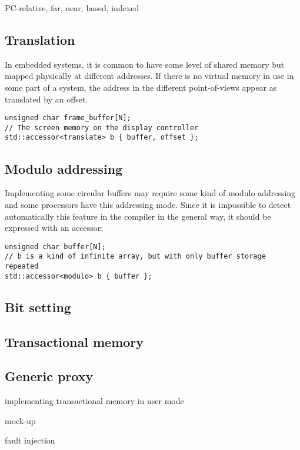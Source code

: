 \documentclass[a4paper]{article}
\begin{document}
PC-relative, far, near, based, indexed

\subsection{Translation}
\label{sec:translation}

In embedded systems, it is common to have some level of shared memory
but mapped physically at different addresses. If there is no virtual
memory in use in some part of a system, the address in the different
point-of-views appear as translated by an offset.
\begin{lstlisting}
unsigned char frame_buffer[N];
// The screen memory on the display controller
std::accessor<translate> b { buffer, offset };
\end{lstlisting}


\subsection{Modulo addressing}
\label{sec:modulo-addressing}

Implementing some circular buffers may require some kind of modulo
addressing and some processors have this addressing mode. Since it is
impossible to detect automatically this feature in the compiler in the
general way, it should be expressed with an accessor:
\begin{lstlisting}
unsigned char buffer[N];
// b is a kind of infinite array, but with only buffer storage repeated
std::accessor<modulo> b { buffer };
\end{lstlisting}


\subsection{Bit setting}
\label{sec:bit-setting}


\subsection{Transactional memory}
\label{sec:transactional-memory}


\subsection{Generic proxy}
\label{sec:generic-proxy}

implementing transactional memory in user mode

mock-up

fault injection
\end{document}
